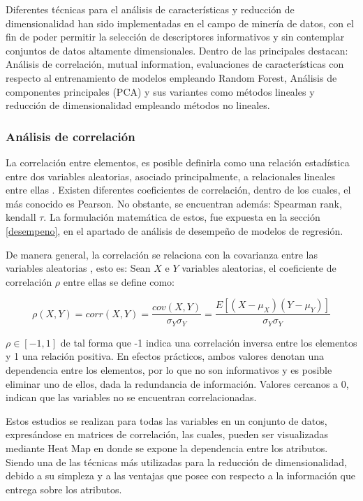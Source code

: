 Diferentes técnicas para el análisis de características y reducción de dimensionalidad han sido implementadas en el campo de minería de datos, con el fin de poder permitir la selección de descriptores informativos y sin contemplar conjuntos de datos altamente dimensionales. Dentro de las principales destacan: Análisis de correlación, mutual information, evaluaciones de características con respecto al entrenamiento de modelos empleando Random Forest, Análisis de componentes principales (PCA) y sus variantes como métodos lineales y reducción de dimensionalidad empleando métodos no lineales. 

\subsubsection{Análisis de correlación}

La correlación entre elementos, es posible definirla como una relación estadística entre dos variables aleatorias, asociado principalmente, a relacionales lineales entre ellas \cite{cohen2014applied}. Existen diferentes coeficientes de correlación, dentro de los cuales, el más conocido es Pearson. No obstante, se encuentran además: Spearman rank, kendall $\tau$. La formulación matemática de estos, fue expuesta en la sección \ref{desempeno}, en el apartado de análisis de desempeño de modelos de regresión.

De manera general, la correlación se relaciona con la covarianza entre las variables aleatorias \cite{cohen2014applied}, esto es: Sean $X$ e $Y$ variables aleatorias, el coeficiente de correlación $\rho$ entre ellas se define como:

\begin{equation}
	\rho (X,Y) = corr(X,Y) = \dfrac{cov(X,Y)}{\sigma_{Y}\sigma_{Y}} = \dfrac{E[(X - \mu_{X})(Y - \mu_{Y})]}{\sigma_{Y}\sigma_{Y}}
\end{equation}

$\rho \in [-1, 1]$ de tal forma que -1 indica una correlación inversa entre los elementos y 1 una relación positiva. En efectos prácticos, ambos valores denotan una dependencia entre los elementos, por lo que no son informativos y es posible eliminar uno de ellos, dada la redundancia de información. Valores cercanos a 0, indican que las variables no se encuentran correlacionadas.

Estos estudios se realizan para todas las variables en un conjunto de datos, expresándose en matrices de correlación, las cuales, pueden ser visualizadas mediante Heat Map en donde se expone la dependencia entre los atributos. Siendo una de las técnicas más utilizadas para la reducción de dimensionalidad, debido a su simpleza y a las ventajas que posee con respecto a la información que entrega sobre los atributos.


